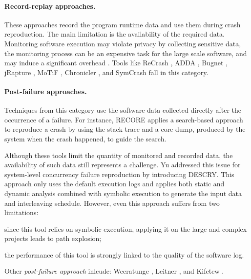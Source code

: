 \paragraph{Record-replay approaches.}

These approaches record the program runtime data and use them during crash reproduction. The main limitation is the availability of the required data. Monitoring software execution may violate privacy by collecting sensitive data, the monitoring process can be an expensive task for the large scale software, and may induce a significant overhead \cite{Chen2015, Nayrolles2017, Rossler2013}.
%
Tools like \textrm{ReCrash} \cite{Artzi2008}, \textrm{ADDA} \cite{Clause2007}, \textrm{Bugnet} \cite{Narayanasamy2005}, \textrm{jRapture} \cite{Steven2000}, \textrm{MoTiF} \cite{Gomez2016}, \textrm{Chronicler} \cite{Bell2013}, and \textrm{SymCrash} \cite{Cao2014} fall in this category.


\paragraph{Post-failure approaches.}

Techniques from this category use the software data collected directly after the occurrence of a failure. For instance, \textrm{RECORE} \cite{Rossler2013} applies a search-based approach to reproduce a crash by using the stack trace and a core dump, produced by the system when the crash happened, to guide the search.

Although these tools limit the quantity of monitored and recorded data, the availability of such data still represents a challenge. 
Yu \etal \cite{YZW17descry} addressed this issue for system-level concurrency failure reproduction by introducing \textrm{DESCRY}. 
This approach only uses the default execution logs and applies both static and dynamic analysis combined with symbolic execution to generate the input data and interleaving schedule. 
However, even this approach suffers from two limitations: 
\begin{inparaenum}[(i)]
\item since this tool relies on symbolic execution, applying it on the large and complex projects leads to path explosion;
\item the performance of this tool is strongly linked to the quality of the software log.
\end{inparaenum}
%
Other \textit{post-failure approach} inlcude: Weeratunge \etal \cite{Weeratunge2010}, Leitner \etal \cite{Leitner2007, Leitner2009}, and Kifetew \etal \cite{Kifetew2013, Kifetew2014}.

